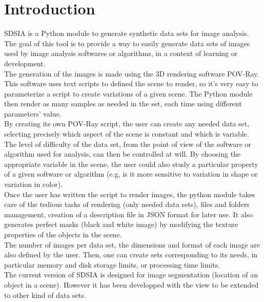 \section*{Introduction}

SDSIA is a Python module to generate synthetic data sets for image analysis.\\

The goal of this tool is to provide a way to easily generate data sets of images used by image analysis softwares or algorithms, in a context of learning or development.\\

The generation of the images is made using the 3D rendering software POV-Ray. This software uses text scripts to defined the scene to render, so it's very easy to parameterize a script to create variations of a given scene. The Python module then render as many samples as needed in the set, each time using different parameters' value.\\

By creating its own POV-Ray script, the user can create any needed data set, selecting precisely which aspect of the scene is constant and which is variable. The level of difficulty of the data set, from the point of view of the software or algorithm used for analysis, can then be controlled at will. By choosing the appropriate variable in the scene, the user could also study a particular property of a given software or algorithm (e.g, is it more sensitive to variation in shape or variation in color).\\

Once the user has written the script to render images, the python module takes care of the tedious tasks of rendering (only needed data sets), files and folders management, creation of a description file in JSON format for later use. It also generates perfect masks (black and white image) by modifying the texture properties of the objects in the scene.\\

The number of images per data set, the dimensions and format of each image are also defined by the user. Then, one can create sets corresponding to its needs, in particular memory and disk storage limits, or processing time limits.\\

The current version of SDSIA is designed for image segmentation (location of an object in a scene). However it has been developped with the view to be extended to other kind of data sets.\\

